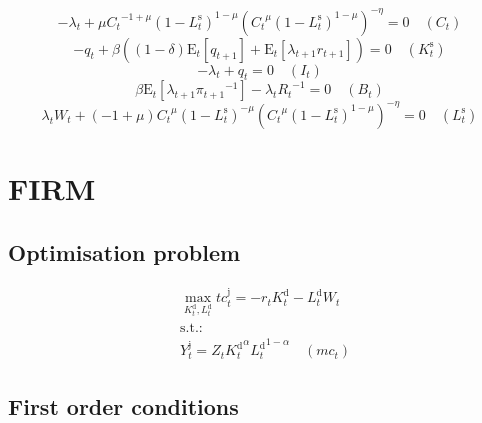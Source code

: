 \begin{equation}
-\lambda_{t} + {\mu} {{C_{t}}^{-1 + \mu}} {\left(1 - L^{\mathrm{s}}_{t}\right)^{1 - \mu}} {\left({{C_{t}}^{\mu}} {\left(1 - L^{\mathrm{s}}_{t}\right)^{1 - \mu}}\right)^{-\eta}} = 0
 \quad \left(C_{t}\right)
\end{equation}
\begin{equation}
-q_{t} + {\beta} \left(\left(1 - \delta\right) {\mathrm{E}_{t}\left[q_{t+1}\right]} + \mathrm{E}_{t}\left[{\lambda_{t+1}} {r_{t+1}}\right]\right) = 0
 \quad \left(K^{\mathrm{s}}_{t}\right)
\end{equation}
\begin{equation}
-\lambda_{t} + q_{t} = 0
 \quad \left(I_{t}\right)
\end{equation}
\begin{equation}
{\beta} {\mathrm{E}_{t}\left[{\lambda_{t+1}} {\pi_{t+1}}^{-1}\right]} - {\lambda_{t}} {R_{t}}^{-1} = 0
 \quad \left(B_{t}\right)
\end{equation}
\begin{equation}
{\lambda_{t}} {W_{t}} + \left(-1 + \mu\right) {{C_{t}}^{\mu}} {\left(1 - L^{\mathrm{s}}_{t}\right)^{-\mu}} {\left({{C_{t}}^{\mu}} {\left(1 - L^{\mathrm{s}}_{t}\right)^{1 - \mu}}\right)^{-\eta}} = 0
 \quad \left(L^{\mathrm{s}}_{t}\right)
\end{equation}




\section{FIRM}

\subsection{Optimisation problem}

\begin{align}
&\max_{K^{\mathrm{d}}_{t}, L^{\mathrm{d}}_{t}
} {t\!c}^{\mathrm{j}}_{t} = -{r_{t}} {K^{\mathrm{d}}_{t}} - {L^{\mathrm{d}}_{t}} {W_{t}}\\
&\mathrm{s.t.:}\nonumber\\
& Y^{\mathrm{j}}_{t} = {Z_{t}} {{K^{\mathrm{d}}_{t}}^{\alpha}} {{L^{\mathrm{d}}_{t}}^{1 - \alpha}} \quad \left({m\!c}_{t}\right)
\end{align}


\subsection{First order conditions}

